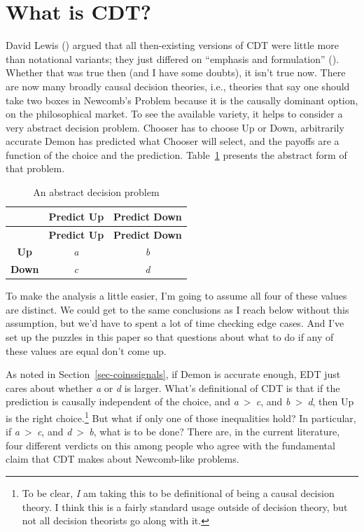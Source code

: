 \documentclass[
  10pt,
  letterpaper,
  DIV=11,
  numbers=noendperiod,
  twoside]{scrartcl}
\begin{document}
\section{What is CDT?}\label{sec-cdt-definition}

David Lewis () argued that all
then-existing versions of CDT were little more than notational variants;
they just differed on ``emphasis and formulation''
(). Whether that was true then
(and I have some doubts), it isn't true now. There are now many broadly
causal decision theories, i.e., theories that say one should take two
boxes in Newcomb's Problem because it is the causally dominant option,
on the philosophical market. To see the available variety, it helps to
consider a very abstract decision problem. Chooser has to choose Up or
Down, arbitrarily accurate Demon has predicted what Chooser will select,
and the payoffs are a function of the choice and the prediction.
Table~\ref{tbl-abstract} presents the abstract form of that problem.

\begin{longtable}[]{@{}ccc@{}}
\caption{An abstract decision
problem}\label{tbl-abstract}\tabularnewline
\toprule\noalign{}
& \textbf{Predict Up} & \textbf{Predict Down} \\
\midrule\noalign{}
\endfirsthead
\toprule\noalign{}
& \textbf{Predict Up} & \textbf{Predict Down} \\
\midrule\noalign{}
\endhead
\bottomrule\noalign{}
\endlastfoot
\textbf{Up} & \emph{a} & \emph{b} \\
\textbf{Down} & \emph{c} & \emph{d} \\
\end{longtable}

To make the analysis a little easier, I'm going to assume all four of
these values are distinct. We could get to the same conclusions as I
reach below without this assumption, but we'd have to spent a lot of
time checking edge cases. And I've set up the puzzles in this paper so
that questions about what to do if any of these values are equal don't
come up.

As noted in Section~\ref{sec-coinssignals}, if Demon is accurate enough,
EDT just cares about whether \emph{a} or \emph{d} is larger. What's
definitional of CDT is that if the prediction is causally independent of
the choice, and \emph{a}~\textgreater~\emph{c}, and
\emph{b}~\textgreater~\emph{d}, then Up is the right choice.\footnote{To
  be clear, \emph{I} am taking this to be definitional of being a causal
  decision theory. I think this is a fairly standard usage outside of
  decision theory, but not all decision theorists go along with it.} But
what if only one of those inequalities hold? In particular, if
\emph{a}~\textgreater~\emph{c}, and \emph{d}~\textgreater~\emph{b}, what
is to be done? There are, in the current literature, four different
verdicts on this among people who agree with the fundamental claim that
CDT makes about Newcomb-like problems.
\end{document}
